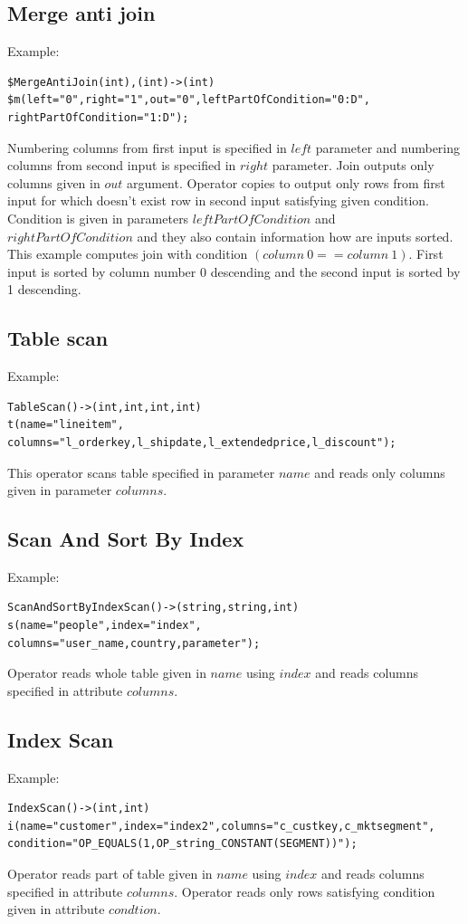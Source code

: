 \subsection{Merge anti join}
Example:
\begin{lstlisting}
$MergeAntiJoin(int),(int)->(int)
$m(left="0",right="1",out="0",leftPartOfCondition="0:D",
rightPartOfCondition="1:D");
\end{lstlisting}

Numbering columns from first input is specified in $left$ parameter and numbering columns from second input is specified in $right$ parameter. Join outputs only columns given in $out$ argument. Operator copies to output only rows from first input for which doesn't exist row in second input satisfying given condition.
Condition is given in parameters $leftPartOfCondition$ and $rightPartOfCondition$ and they also contain information how are inputs sorted. This example computes join with condition $(column~0==column~1)$. First input is sorted by column number 0 descending and the second input is sorted by 1 descending.

\subsection{Table scan}
Example:
\begin{lstlisting}
TableScan()->(int,int,int,int)
t(name="lineitem",
columns="l_orderkey,l_shipdate,l_extendedprice,l_discount");
\end{lstlisting}
This operator scans table specified in parameter $name$ and reads only columns given in parameter $columns$.

\subsection{Scan And Sort By Index}
Example:
\begin{lstlisting}
ScanAndSortByIndexScan()->(string,string,int)
s(name="people",index="index",
columns="user_name,country,parameter"); 
\end{lstlisting}
Operator reads whole table given in $name$ using $index$ and reads columns specified in attribute $columns$.

\subsection{Index Scan}

Example:
\begin{lstlisting}
IndexScan()->(int,int)
i(name="customer",index="index2",columns="c_custkey,c_mktsegment",
condition="OP_EQUALS(1,OP_string_CONSTANT(SEGMENT))");
\end{lstlisting}
Operator reads part of table given in $name$ using $index$ and reads columns specified in attribute $columns$. Operator reads only rows satisfying condition given in attribute $condtion$.



